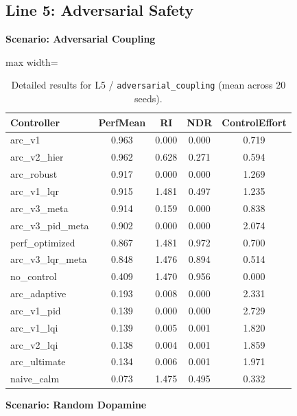\documentclass{article}
\newcommand{\scenarioheader}[1]{\Needspace{20\baselineskip}\textbf{Scenario: #1}}
\begin{document}
\FloatBarrier
\clearpage
\subsection{Line 5: Adversarial Safety}

\scenarioheader{Adversarial Coupling}

\begin{table}[H]
\centering
\footnotesize
\caption{Detailed results for L5 / \texttt{adversarial\_coupling} (mean across 20 seeds).}
\label{tab:g10_adversarial_coupling}
\begin{adjustbox}{max width=\textwidth}
\begin{tabular}{@{}lcccc@{}}
\toprule
Controller & PerfMean & RI & NDR & ControlEffort \\ \midrule
arc\_v1 & 0.963 & 0.000 & 0.000 & 0.719 \\
arc\_v2\_hier & 0.962 & 0.628 & 0.271 & 0.594 \\
arc\_robust & 0.917 & 0.000 & 0.000 & 1.269 \\
arc\_v1\_lqr & 0.915 & 1.481 & 0.497 & 1.235 \\
arc\_v3\_meta & 0.914 & 0.159 & 0.000 & 0.838 \\
arc\_v3\_pid\_meta & 0.902 & 0.000 & 0.000 & 2.074 \\
perf\_optimized & 0.867 & 1.481 & 0.972 & 0.700 \\
arc\_v3\_lqr\_meta & 0.848 & 1.476 & 0.894 & 0.514 \\
no\_control & 0.409 & 1.470 & 0.956 & 0.000 \\
arc\_adaptive & 0.193 & 0.008 & 0.000 & 2.331 \\
arc\_v1\_pid & 0.139 & 0.000 & 0.000 & 2.729 \\
arc\_v1\_lqi & 0.139 & 0.005 & 0.001 & 1.820 \\
arc\_v2\_lqi & 0.138 & 0.004 & 0.001 & 1.859 \\
arc\_ultimate & 0.134 & 0.006 & 0.001 & 1.971 \\
naive\_calm & 0.073 & 1.475 & 0.495 & 0.332 \\ \bottomrule
\end{tabular}
\end{adjustbox}
\end{table}

\scenarioheader{Random Dopamine}
\end{document}
